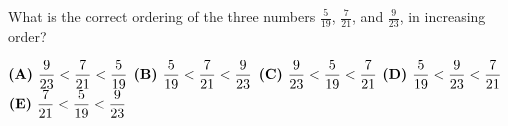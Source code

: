 

What is the correct ordering of the three numbers $\frac5{19}$, $\frac7{21}$, and $\frac9{23}$, in increasing order?

$\textbf{(A)}\hspace{.05in}\dfrac9{23} < \dfrac7{21} < \dfrac5{19}$
$\textbf{(B)}\hspace{.05in}\dfrac5{19} < \dfrac7{21} < \dfrac9{23}$
$\textbf{(C)}\hspace{.05in}\dfrac9{23} < \dfrac5{19} < \dfrac7{21}$
$\textbf{(D)}\hspace{.05in}\dfrac5{19} < \dfrac9{23} < \dfrac7{21}$
$\textbf{(E)}\hspace{.05in}\dfrac7{21} < \dfrac5{19} < \dfrac9{23}$
